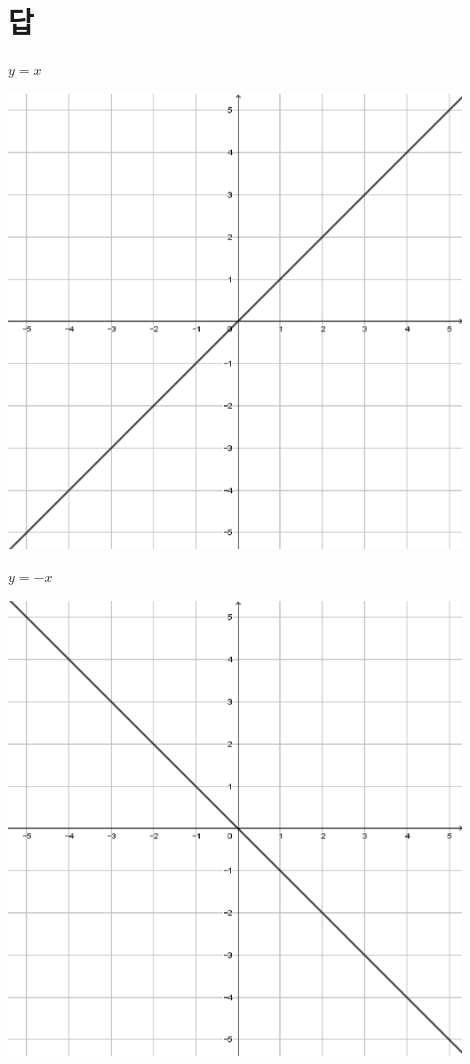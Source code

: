 \documentclass[a4paper]{oblivoir}
\let\oldsection\section
\renewcommand\section{\clearpage\oldsection}
\begin{document}
\section*{답}

\begin{minipage}{0.45\textwidth}\centering
\(y=x\)
\par\bigskip\includegraphics[width=0.9\textwidth]{img/1_line_1}
\end{minipage}
\begin{minipage}{0.45\textwidth}\centering
\(y=-x\)
\par\bigskip\includegraphics[width=0.9\textwidth]{img/1_line_2}
\end{minipage}\bigskip\bigskip\par
\end{document}
